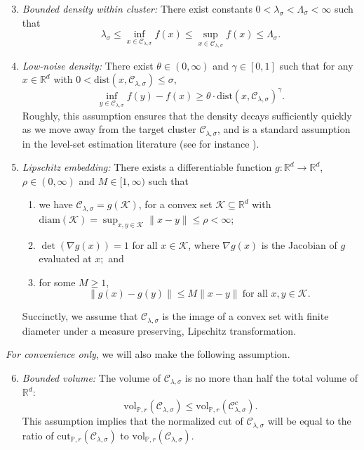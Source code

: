 \documentclass[11pt,twoside]{article}
\newcommand{\Reals}{\mathbb{R}}
\newcommand{\1}{\mathbf{1}}
\newcommand{\Rd}{\Reals^d}
\newcommand{\mc}[1]{\mathcal{#1}}
\newcommand{\Pbb}{\mathbb{P}}
\newcommand{\dist}{\mathrm{dist}}
\newcommand{\vol}{\mathrm{vol}}
\newcommand{\cut}{\mathrm{cut}}
\begin{document}
\begin{enumerate}[label=(A\arabic*)]
	\setcounter{enumi}{2}
	\item
	\label{asmp:lambda_bounded_density}
	\emph{Bounded density within cluster:} There exist constants
	$0<\lambda_{\sigma}< \Lambda_{\sigma}<\infty$ such that 
	$$
	\lambda_{\sigma} \leq \inf_{x \in \mc{C}_{\lambda,\sigma}} f(x) \leq \sup_{x \in \mc{C}_{\lambda,\sigma}} f(x)
	\leq \Lambda_{\sigma}.
	$$
	
	\item 
	\label{asmp:low_noise_density}
	\emph{Low-noise density:} There exist $\theta \in (0,\infty)$ and $\gamma \in
	[0,1]$ such that for any $x \in \Rd$ with $0 < \dist(x, \mc{C}_{\lambda,\sigma}) \leq \sigma$,     
	$$
	\inf_{y \in \mc{C}_{\lambda,\sigma}} f(y) - f(x) \geq  \theta \cdot \dist(x, \mc{C}_{\lambda,\sigma})^{\gamma}.  
	$$
	Roughly, this assumption ensures that the density decays sufficiently quickly
	as we move away from the target cluster $\mc{C}_{\lambda,\sigma}$, and is a standard assumption
	in the level-set estimation literature (see for instance \citet{singh2009}).
	
	\item
	\label{asmp:embedding}
	\emph{Lipschitz embedding:}
	There exists a differentiable function $g: \Reals^d \to \Reals^d$, $\rho \in (0,\infty)$ and $M \in [1,\infty)$ such that
	\begin{enumerate}
		\item we have $\mc{C}_{\lambda,\sigma} = g(\mathcal{K})$, for a convex set $\mathcal{K}
		\subseteq \Rd$ with $\mathrm{diam}(\mathcal{K}) = \sup_{x,y \in
			\mathcal{K}}\|x - y\| \leq \rho < \infty$;
		\item $\det(\nabla g (x)) = 1$ for all $x \in \mc{K}$, where $\nabla g(x)$ is
		the Jacobian of $g$ evaluated at $x;$ and 
		\item for some $M \geq 1$,   
		$$
		\|g(x) - g(y)\| \leq M \|x - y\| ~
		\text{for all $x,y \in \mathcal{K}$}. 
		$$
	\end{enumerate}
	Succinctly, we assume that $\mc{C}_{\lambda,\sigma}$ is the image of a convex set with finite
	diameter under a measure preserving, Lipschitz transformation. 
\end{enumerate}

\emph{For convenience only}, we will also make the following assumption.
\begin{enumerate}[label=(A\arabic*)]
	\setcounter{enumi}{5}
	\item
	\label{asmp:bounded_volume}
	\emph{Bounded volume:}
	The volume of $\mc{C}_{\lambda,\sigma}$ is no more than half the total volume of $\Rd$:
	$$
	\vol_{\Pbb,r}(\mc{C}_{\lambda,\sigma}) \leq \vol_{\Pbb,r}(\mc{C}_{\lambda,\sigma}^c). 
	$$
	This assumption implies that the normalized cut of $\mc{C}_{\lambda,\sigma}$ will be equal to the ratio of $\cut_{\Pbb,r}(\mc{C}_{\lambda,\sigma})$ to $\vol_{\Pbb,r}(\mc{C}_{\lambda,\sigma})$.
\end{enumerate}
\end{document}
